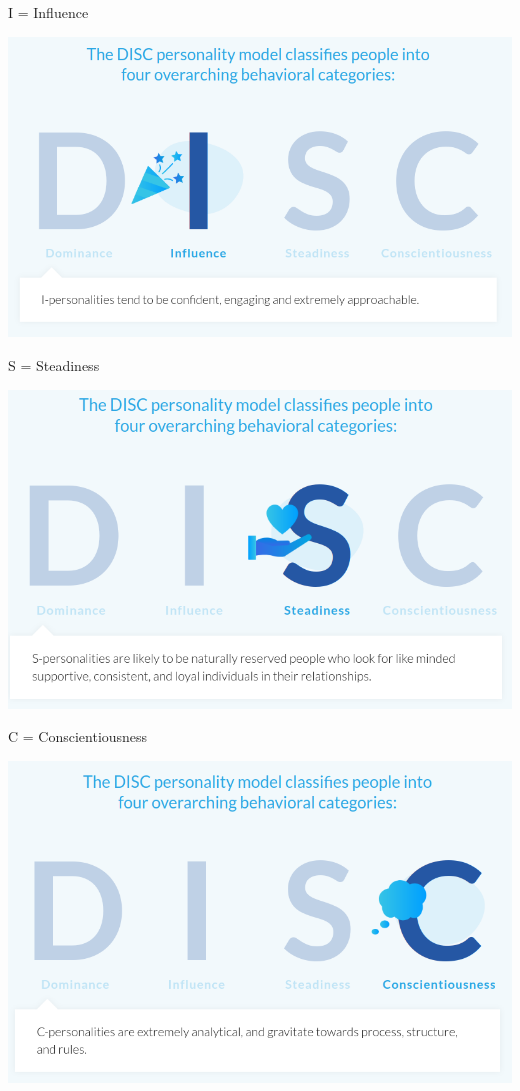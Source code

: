 \documentclass{beamer}
\theoremstyle{mystyle}
\begin{document}
\begin{frame}{I = Influence}
	\begin{center}
		\includegraphics[scale=.35]{images/i-of-disc}
	\end{center}
\end{frame}

\begin{frame}{S = Steadiness}
	\begin{center}
		\includegraphics[scale=.35]{images/s-of-disc}
	\end{center}
\end{frame}

\begin{frame}{C = Conscientiousness}
	\begin{center}
		\includegraphics[scale=.35]{images/c-of-disc}
	\end{center}
\end{frame}
\end{document}
